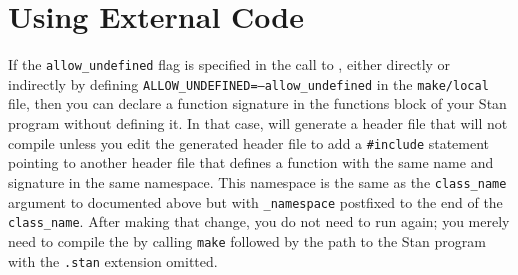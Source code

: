 \section{Using External \Cpp Code}

If the {\tt allow\_undefined} flag is specified in the call to \stanc, 
either directly or indirectly by defining 
{\tt ALLOW\_UNDEFINED=--allow\_undefined} in the {\tt make/local} file,
then you can declare a function signature in the functions block of
your Stan program without defining it. In that case, \stanc will 
generate a \Cpp header file that will not compile unless you edit the 
generated \Cpp header file to add a {\tt \#include} statement pointing
to another \Cpp header file that defines a function with the same name
and signature in the same namespace. This namespace is the same as the
{\tt class\_name} argument to \stanc documented above but with
{\tt \_namespace} postfixed to the end of the {\tt class\_name}. After
making that change, you do not need to run \stanc again; you merely 
need to compile the \Cpp by calling {\tt make} followed by the path
to the Stan program with the {\tt .stan} extension omitted.

